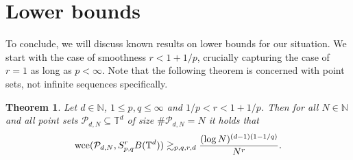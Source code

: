 \documentclass[12pt, a4paper]{article}
\newtheorem{thm}{Theorem}
\newcommand{\wce}{{\rm wce}}
\newcommand{\peter}[1]{\begingroup\color{violet}#1\endgroup}
\newcommand{\calP}{{\mathcal{P}}}
\newcommand{\bbT}{{\mathbb{T}}}
\newcommand{\bbN}{{\mathbb{N}}}
\begin{document}
\iffalse
\section{Lower bounds}

To conclude, we will discuss known results on lower bounds for our situation. We start with the case of smoothness $r < 1 + 1/p$, crucially capturing the case of $r=1$ as long as $p < \infty$. Note that the following theorem is concerned with point sets, not infinite sequences specifically.

\begin{thm} \label{thm:lower_r_less_1}
    Let $d \in \bbN$, $1 \leq p, q \leq \infty$ and $1/p < r < 1+1/p$. Then for all $N \in \bbN$ and all point sets $\calP_{d, N} \subseteq \bbT^d$ of size $\#\calP_{d, N} = N$ it holds \peter{that}
    $$
    \wce(\calP_{d, N}, S^r_{p, q}B(\bbT^d)) \gtrsim_{p, q, r, d} \frac{(\log N)^{(d-1)(1-1/q)}}{N^r}. 
    $$
\end{thm}
\end{document}
